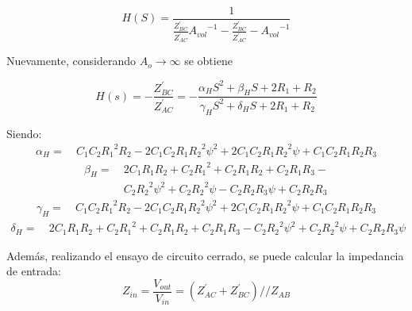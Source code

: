 \documentclass[a4paper]{article}
\begin{document}
\begin{equation*}
	H(S) = \frac{1}{\frac{Z_{BC}^{'}}{Z_{AC}^{'}} {A_{vol}}^{-1} - \frac{Z_{BC}^{'}}{Z_{AC}^{'}} - {A_{vol}}^{-1}}
	\label{equ:hsavol}
\end{equation*}

Nuevamente, considerando $A_o \rightarrow \infty$ se obtiene

\begin{equation}
	H(s) = -\frac{Z_{BC}^{'}}{Z_{AC}^{'}} = - \frac{\alpha_H S^{2} + \beta_H S + 2 R_{1} + R_{2}}
	{\gamma_H S^{2} + \delta_H S + 2 R_{1} + R_{2}}
	\label{equ:hs}
\end{equation}

Siendo: 
\begin{equation*}
\begin{split}
	\alpha_H =\ & C_{1} C_{2} {R_{1}}^{2} R_{2} - 2 C_{1} C_{2} R_{1} {R_{2}}^{2} \psi^{2} + 2 C_{1} C_{2} R_{1} {R_{2}}^{2} \psi + C_{1} C_{2} R_{1} R_{2} R_{3}
\end{split}
\end{equation*}
\begin{equation*}
\begin{split}
	\beta_H =\ & 2 C_{1} R_{1} R_{2} + C_{2} {R_{1}}^{2} + C_{2} R_{1} R_{2} + C_{2} R_{1} R_{3} -\\ & C_{2} {R_{2}}^{2} \psi^{2} + C_{2} {R_{2}}^{2} \psi - C_{2} R_{2} R_{3} \psi + C_{2} R_{2} R_{3}
\end{split}
\end{equation*}
\begin{equation*}
\begin{split}
	\gamma_H =\ & C_{1} C_{2} {R_{1}}^{2} R_{2} - 2 C_{1} C_{2} R_{1} {R_{2}}^{2} \psi^{2} + 2 C_{1} C_{2} R_{1} {R_{2}}^{2} \psi + C_{1} C_{2} R_{1} R_{2} R_{3}
\end{split}
\end{equation*}
\begin{equation*}
\begin{split}
 \delta_H =\ & 2 C_{1} R_{1} R_{2} + C_{2} {R_{1}}^{2} + C_{2} R_{1} R_{2} + C_{2} R_{1} R_{3} - C_{2} {R_{2}}^{2} \psi^{2} + C_{2} {R_{2}}^{2} \psi + C_{2} R_{2} R_{3} \psi
\end{split}
\end{equation*}

Además, realizando el ensayo de circuito cerrado, se puede calcular la impedancia de entrada:
\begin{equation}
	Z_{in} = \frac{V_{out}}{V_{in}} = \left( Z_{AC}^{'} + Z_{BC}^{'} \right) // Z_{AB}
	\label{equ:zin}
\end{equation}
\end{document}
